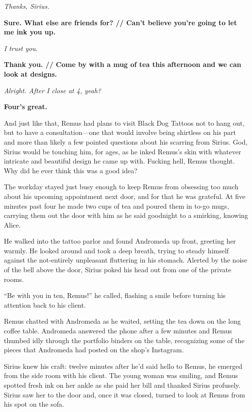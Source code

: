 \textit{Thanks, Sirius.
}

\textbf{Sure. What else are friends for? // Can’t believe you’re going to let me ink you up.
}

\textit{I trust you.
}

\textbf{Thank you. // Come by with a mug of tea this afternoon and we can look at designs.
}

\textit{Alright. After I close at 4, yeah?
}

\textbf{Four’s great.
}

And just like that, Remus had plans to visit Black Dog Tattoos not to hang out, but to have a consultation—one that would involve being shirtless on his part and more than likely a few pointed questions about his scarring from Sirius. God, Sirius would be touching him, for ages, as he inked Remus’s skin with whatever intricate and beautiful design he came up with. Fucking hell, Remus thought. Why did he ever think this was a good idea?

The workday stayed just busy enough to keep Remus from obsessing too much about his upcoming appointment next door, and for that he was grateful. At five minutes past four he made two cups of tea and poured them in to-go mugs, carrying them out the door with him as he said goodnight to a smirking, knowing Alice.

He walked into the tattoo parlor and found Andromeda up front, greeting her warmly. He looked around and took a deep breath, trying to steady himself against the not-entirely unpleasant fluttering in his stomach. Alerted by the noise of the bell above the door, Sirius poked his head out from one of the private rooms.

“Be with you in ten, Remus!” he called, flashing a smile before turning his attention back to his client.

Remus chatted with Andromeda as he waited, setting the tea down on the long coffee table. Andromeda answered the phone after a few minutes and Remus thumbed idly through the portfolio binders on the table, recognizing some of the pieces that Andromeda had posted on the shop's Instagram.

Sirius knew his craft: twelve minutes after he’d said hello to Remus, he emerged from the side room with his client. The young woman was smiling, and Remus spotted fresh ink on her ankle as she paid her bill and thanked Sirius profusely. Sirius saw her to the door and, once it was closed, turned to look at Remus from his spot on the sofa.

